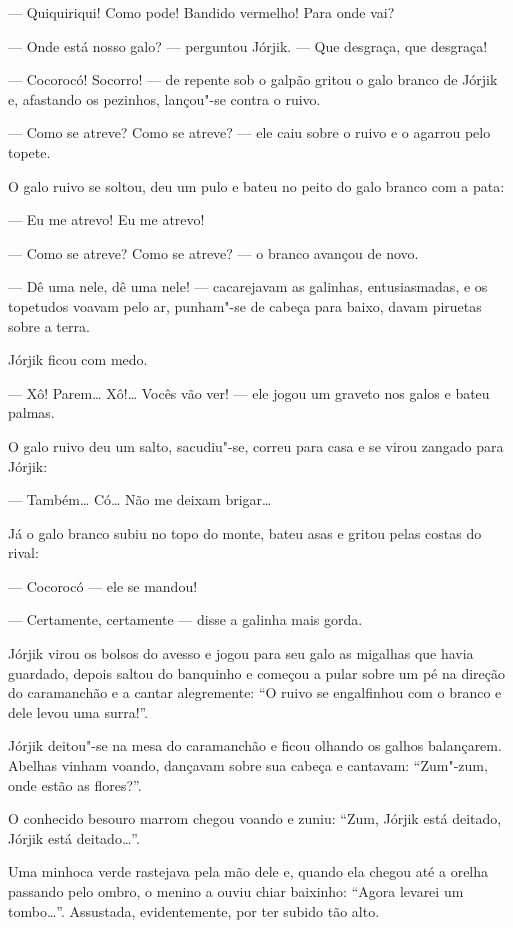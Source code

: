 --- Quiquiriqui! Como pode! Bandido vermelho! Para onde vai?

--- Onde está nosso galo? --- perguntou Jórjik. --- Que desgraça, que
desgraça!

--- Cocorocó! Socorro! --- de repente sob o galpão gritou o galo branco
de Jórjik e, afastando os pezinhos, lançou"-se contra o ruivo.

--- Como se atreve? Como se atreve? --- ele caiu sobre o ruivo e o
agarrou pelo topete.

O galo ruivo se soltou, deu um pulo e bateu no peito do galo branco com
a pata:

--- Eu me atrevo! Eu me atrevo!

--- Como se atreve? Como se atreve? --- o branco avançou de novo.

--- Dê uma nele, dê uma nele! --- cacarejavam as galinhas,
entusiasmadas, e os topetudos voavam pelo ar, punham"-se de cabeça para
baixo, davam piruetas sobre a terra.

Jórjik ficou com medo.

--- Xô! Parem\ldots{} Xô!\ldots{} Vocês vão ver! --- ele jogou um graveto nos
galos e bateu palmas.

O galo ruivo deu um salto, sacudiu"-se, correu para casa e se virou
zangado para Jórjik:

--- Também\ldots{} Có\ldots{} Não me deixam brigar\ldots{}

Já o galo branco subiu no topo do monte, bateu asas e gritou pelas
costas do rival:

--- Cocorocó --- ele se mandou!

--- Certamente, certamente --- disse a galinha mais gorda.

Jórjik virou os bolsos do avesso e jogou para seu galo as migalhas que
havia guardado, depois saltou do banquinho e começou a pular sobre um pé
na direção do caramanchão e a cantar alegremente: ``O ruivo se
engalfinhou com o branco e dele levou uma surra!''.

Jórjik deitou"-se na mesa do caramanchão e ficou olhando os galhos
balançarem. Abelhas vinham voando, dançavam sobre sua cabeça e cantavam:
``Zum"-zum, onde estão as flores?''.

O conhecido besouro marrom chegou voando e zuniu: ``Zum, Jórjik está
deitado, Jórjik está deitado\ldots{}''.

Uma minhoca verde rastejava pela mão dele e, quando ela chegou até a
orelha passando pelo ombro, o menino a ouviu chiar baixinho: ``Agora levarei um
tombo\ldots{}''. Assustada, evidentemente, por ter subido tão alto.

